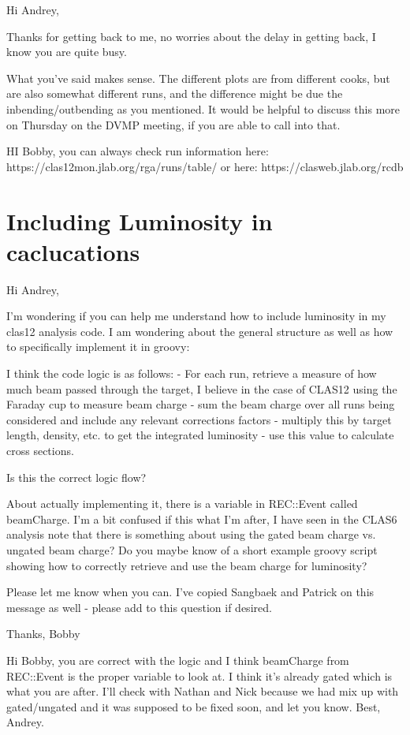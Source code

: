 Hi Andrey,

Thanks for getting back to me, no worries about the delay in getting back, I know you are quite busy.

What you've said makes sense. The different plots are from different cooks, but are also somewhat different runs, and the difference might be due the inbending/outbending as you mentioned. It would be helpful to discuss this more on Thursday on the DVMP meeting, if you are able to call into that.

HI Bobby,
you can always check run information here: https://clas12mon.jlab.org/rga/runs/table/ or here: https://clasweb.jlab.org/rcdb


\section{Including Luminosity in caclucations}

    Hi Andrey,
    
    I'm wondering if you can help me understand how to include luminosity in my clas12 analysis code. I am wondering about the general structure as well as how to specifically implement it in groovy:
    
    I think the code logic is as follows:
    - For each run, retrieve a measure of how much beam passed through the target, I believe in the case of CLAS12 using the Faraday cup to measure beam charge
    - sum the beam charge over all runs being considered and include any relevant corrections factors
    - multiply this by target length, density, etc. to get the integrated luminosity
    - use this value to calculate cross sections.
    
    Is this the correct logic flow?
    
    
    About actually implementing it, there is a variable in REC::Event called beamCharge. I'm a bit confused if this what I'm after, I have seen in the CLAS6 analysis note that there is something about using the gated beam charge vs. ungated beam charge? Do you maybe know of a short example groovy script showing how to correctly retrieve and use the beam charge for luminosity?
    
    
    Please let me know when you can. I've copied Sangbaek and Patrick on this message as well - please add to this question if desired.
    
    Thanks,
    Bobby
    
    Hi Bobby,
    you are correct with the logic and I think beamCharge from REC::Event is the proper variable to look at. I think it's already gated which is what you are after. I'll check with Nathan and Nick because we had mix up with gated/ungated and it was supposed to be fixed soon, and let you know.
    Best,
    Andrey.
    
